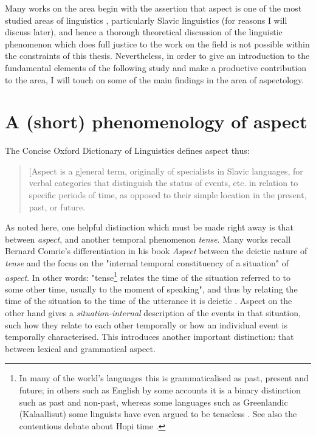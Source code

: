 Many works on the area begin with the assertion that aspect is one of the most studied areas of linguistics \citep{Sasse2002RecentAI}, particularly Slavic linguistics (for reasons I will discuss later), and hence a thorough theoretical discussion of the linguistic phenomenon which does full justice to the work on the field is not possible within the constraints of this thesis. Nevertheless, in order to give an introduction to the fundamental elements of the following study and make a productive contribution to the area, I will touch on some of the main findings in the area of aspectology.
\section{A (short) phenomenology of aspect}
The Concise Oxford Dictionary of Linguistics \citep{matthews2014concise} defines aspect thus: 

\begin{quotation}
    [Aspect is a g]eneral term, originally of specialists in Slavic languages, for verbal categories that distinguish the status of events, etc. in relation to specific periods of time, as opposed to their simple location in the present, past, or future.
\end{quotation}

As noted here, one helpful distinction which must be made right away is that between \emph{aspect}, and another temporal phenomenon \emph{tense}. Many works recall Bernard Comrie's differentiation in his book \emph{Aspect} \citep{comrie1976aspect} between the deictic nature of \emph{tense} and the focus on the "internal temporal constituency of a situation" of \emph{aspect}. In other words: "tense\footnote{In many of the world's languages this is grammaticalised as past, present and future; in others such as English by some accounts \citep{jespersen2013essentials} it is a binary distinction such as past and non-past, whereas some languages such as Greenlandic (Kalaallisut) some linguists have even argued to be tenseless \citet{10.1093/jos/ffh029}. See also the contentious debate about Hopi time \citet{whorf-writings, hopitime}. } relates the time of the situation referred to to some other time, usually to the moment of speaking", and thus by relating the time of the situation to the time of the utterance it is deictic \citep{comrie1976aspect}. Aspect on the other hand gives a \emph{situation-internal} description of the events in that situation, such how they relate to each other temporally or how an individual event is temporally characterised. This introduces another important distinction: that between lexical and grammatical aspect.

